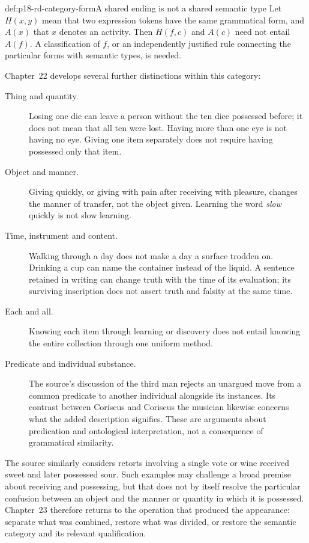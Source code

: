 \begin{hbexample}{def:p18-rd-category-form}{A shared ending is not a shared semantic type}
Let \(H(x,y)\) mean that two expression tokens have the same
grammatical form, and \(A(x)\) that \(x\) denotes an activity.
Then \(H(f,c)\) and \(A(c)\) need not entail \(A(f)\).
A classification of \(f\), or an independently justified rule
connecting the particular forms with semantic types, is needed.
\end{hbexample}

Chapter~22 develops several further distinctions within this category:

\begin{description}
\item[Thing and quantity.] Losing one die can leave a person without
the ten dice possessed before; it does not mean that all ten were lost.
Having more than one eye is not having no eye. Giving one item separately
does not require having possessed only that item.
\item[Object and manner.] Giving quickly, or giving with pain after
receiving with pleasure, changes the manner of transfer, not the object
given. Learning the word \emph{slow} quickly is not slow learning.
\item[Time, instrument and content.] Walking through a day does not
make a day a surface trodden on. Drinking a cup can name the container
instead of the liquid. A sentence retained in writing can change truth
with the time of its evaluation; its surviving inscription does not
assert truth and falsity at the same time.
\item[Each and all.] Knowing each item through learning or discovery
does not entail knowing the entire collection through one uniform method.
\item[Predicate and individual substance.] The source's discussion of
the third man rejects an unargued move from a common predicate to
another individual alongside its instances. Its contrast between
Coriscus and Coriscus the musician likewise concerns what the added
description signifies. These are arguments about predication and
ontological interpretation, not a consequence of grammatical similarity.
\end{description}

The source similarly considers retorts involving a single vote or
wine received sweet and later possessed sour. Such examples may
challenge a broad premise about receiving and possessing, but that
does not by itself resolve the particular confusion between an object
and the manner or quantity in which it is possessed. Chapter~23
therefore returns to the operation that produced the appearance:
separate what was combined, restore what was divided, or restore the
semantic category and its relevant qualification.


